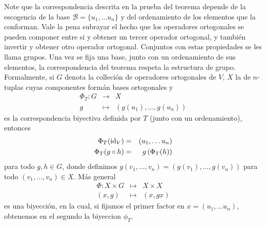 \begin{obs}
Note que la correspondencia descrita en la prueba del teorema depende de la escogencia de la base $\mathcal{B}=\{u_1,\ldots u_n\}$ y del ordenamiento de los elementos que la conforman. Vale la pena subrayar el hecho que los operadores ortogonales se pueden componer entre si y obtener un tercer operador ortogonal, y tambi\'en invertir y obtener otro operador ortogonal. Conjuntos con estas propiedades se les llama grupos. Una vez se fija una base, junto con un ordenamiento de sus elementos, la correspondencia del teorema respeta la estructura de grupo.\\ Formalmente, si $G$ denota la colleci\'on de operadores ortogonales de $V$, $X$ la de $n$-tuplas cuyas componentes form\'an bases ortogonales y
\begin{eqnarray*}
\Phi_T: G & \longrightarrow & X\\
 g & \longmapsto & \left(g(u_1),\ldots,g(u_n)\right)
\end{eqnarray*}
es la correspondencia biyectiva definida por $T$ (junto con un ordenamiento), entonces
\begin{eqnarray*}
\Phi_T(\operatorname{id}_V) & = & (u_1,\ldots u_n)\\
\Phi_T(g\circ h) & = & g\left(\Phi_T(h)\right)
\end{eqnarray*}
para todo $g,h\in G$, donde definimos $g(v_1,\ldots,v_n)=\left(g(v_1),\ldots,g(v_n)\right)$ para todo $(v_1,\ldots,v_n)\in X$. M\'as general
\begin{eqnarray*}
\Phi: X\times G &\longmapsto & X\times X \\
\left(x,g\right) & \longmapsto & \left(x,gx\right)
\end{eqnarray*}
es una biyecci\'on, en la cual, si fijamos el primer factor en $x=(u_1,\ldots u_n)$, obtenemos en el segundo la biyeccion $\phi_T$.
\end{obs}